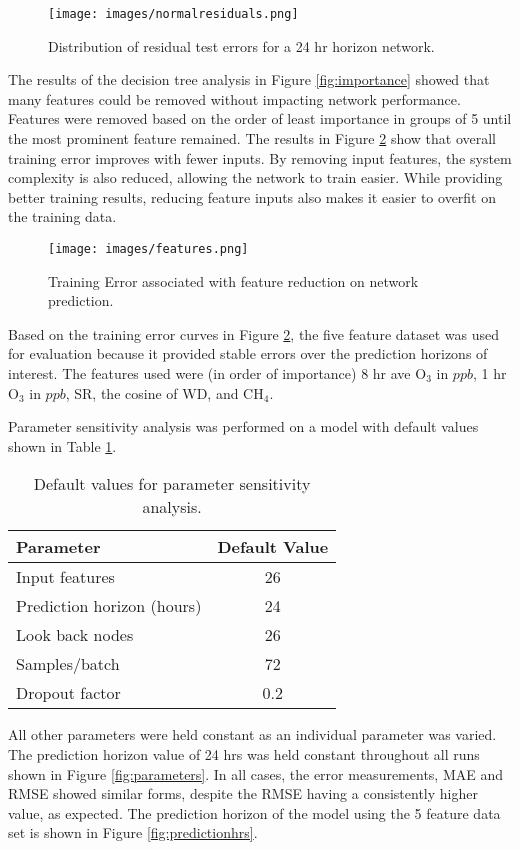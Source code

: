 %
\begin{figure}[H]
\centering
\texttt{[image: images/normalresiduals.png]}
\caption{Distribution of residual test errors for a 24 hr horizon network.}
\label{fig:normalresiduals}
\end{figure}
%

The results of the decision tree analysis in Figure \ref{fig:importance} showed that many features could be removed without impacting network performance. Features were removed based on the order of least importance in groups of 5 until the most prominent feature remained. The results in Figure \ref{fig:features} show that overall training error improves with fewer inputs. By removing input features, the system complexity is also reduced, allowing the network to train easier. While providing better training results, reducing feature inputs also makes it easier to overfit on the training data.
%
\begin{figure}[H]
\centering
\texttt{[image: images/features.png]}
\caption{Training Error associated with feature reduction on network prediction.}
\label{fig:features}
\end{figure}
%
Based on the training error curves in Figure \ref{fig:features}, the five feature dataset was used for evaluation because it provided stable errors over the prediction horizons of interest. The features used were (in order of importance) 8 hr ave O$_{3}$ in $ppb$, 1 hr O$_{3}$ in $ppb$, SR, the cosine of WD, and CH$_{4}$.

Parameter sensitivity analysis was performed on a model with default values shown in Table \ref{tb:default-parameter}.
%

\begin{table}[H]
\centering
\caption{Default values for parameter sensitivity analysis.}
\label{tb:default-parameter}
\begin{tabular}{@{}lc@{}}
\toprule
\textbf{Parameter} & \textbf{Default Value} \\ \midrule
Input features & 26 \\
Prediction horizon (hours) & 24 \\
Look back nodes & 26 \\
Samples/batch & 72 \\
Dropout factor & 0.2 \\ \bottomrule
\end{tabular}
\end{table}
%
All other parameters were held constant as an individual parameter was varied. The prediction horizon value of 24 hrs was held constant throughout all runs shown in  Figure \ref{fig:parameters}. In all cases, the error measurements, MAE and RMSE showed similar forms, despite the RMSE having a consistently higher value, as expected. The prediction horizon of the model using the 5 feature data set is shown in Figure \ref{fig:predictionhrs}.

